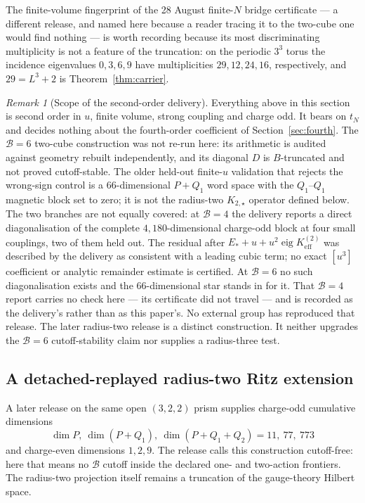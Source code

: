 \documentclass[11pt]{article}
\theoremstyle{plain}
\theoremstyle{definition}
\theoremstyle{remark}
\newtheorem{remark}[theorem]{Remark}
\newcommand{\chk}[1]{}
\begin{document}
The finite-volume fingerprint of the 28 August finite-$N$ bridge certificate
--- a different release, and named here because a reader tracing it to the
two-cube one would find nothing --- is worth recording
because its most discriminating multiplicity is not a feature of the
truncation: on the periodic $3^3$ torus the incidence eigenvalues $0,3,6,9$
have multiplicities $29,12,24,16$, respectively, and $29=L^3+2$ is
Theorem~\ref{thm:carrier}.
\chk{the certificate's finite-volume fingerprints, and 29 = L\^{}3 + 2 is the Lean cycle count}

\begin{remark}[Scope of the second-order delivery]
Everything above in this section is second order in $u$, finite volume,
strong coupling and charge odd. It bears on $t_N$ and decides nothing about the
fourth-order coefficient of Section~\ref{sec:fourth}. The
$\mathcal B=6$ two-cube construction was not re-run here: its arithmetic is
audited against geometry rebuilt independently, and its diagonal $D$ is
$B$-truncated and not proved cutoff-stable. The older held-out finite-$u$
validation that rejects the wrong-sign control is a $66$-dimensional $P+Q_1$
word space with the $Q_1$--$Q_1$ magnetic block set to zero; it is not the
radius-two $K_{2,\star}$ operator defined below. The two branches are not equally
covered: at $\mathcal B=4$ the delivery reports a direct diagonalisation of
the complete $4{,}180$-dimensional charge-odd block at four small couplings,
two of them held out.  The residual after
$E_*+u+u^2\operatorname{eig}K_{\mathrm{eff}}^{(2)}$ was described by the
delivery as consistent with a leading cubic term; no exact $[u^3]$
coefficient or analytic remainder estimate is certified. At $\mathcal B=6$
no such diagonalisation exists and the $66$-dimensional star stands in for
it. That $\mathcal B=4$ report carries no check here --- its certificate
did not travel --- and is recorded as the delivery's rather than as this
paper's. No external group has reproduced that release. The later radius-two
release is a distinct construction. It neither upgrades the $\mathcal B=6$
cutoff-stability claim nor supplies a radius-three test.
\end{remark}

\subsection{A detached-replayed radius-two Ritz extension}
\label{subsec:radius2}

A later release on the same open $(3,2,2)$ prism supplies charge-odd
cumulative dimensions
\[
  \dim P,\ \dim(P+Q_1),\ \dim(P+Q_1+Q_2)=11,\ 77,\ 773
\]
and charge-even dimensions $1,2,9$. The release calls this construction
cutoff-free: here that means no $\mathcal B$ cutoff inside the declared one-
and two-action frontiers. The radius-two projection itself remains a
truncation of the gauge-theory Hilbert space.
\end{document}
